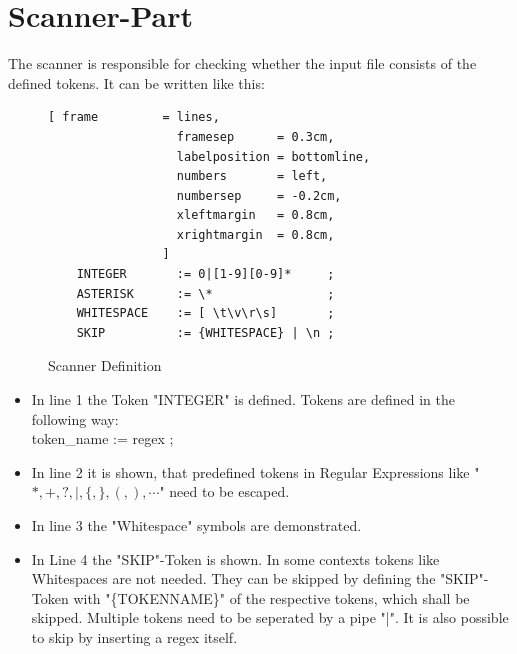 \section{Scanner-Part}
The scanner is responsible for checking whether the input file consists of the defined tokens. It can be written like this:
\begin{figure}[!ht]
\begin{Verbatim}[ frame         = lines, 
                  framesep      = 0.3cm, 
                  labelposition = bottomline,
                  numbers       = left,
                  numbersep     = -0.2cm,
                  xleftmargin   = 0.8cm,
                  xrightmargin  = 0.8cm,
                ]
	INTEGER       := 0|[1-9][0-9]*     ;
	ASTERISK      := \*                ;
	WHITESPACE    := [ \t\v\r\s]       ;
	SKIP          := {WHITESPACE} | \n ;
\end{Verbatim}
\caption{Scanner Definition}
\label{fig:scanner_def}
\end{figure}
\begin{itemize}
	\item In line 1 the Token "INTEGER" is defined. Tokens are defined in the following way:\\
					token\_name := regex ;
	\item In line 2 it is shown, that predefined tokens in Regular Expressions like "$*,+,?,|,\{,\},(,),\cdots$" need to be escaped.
	\item In line 3 the "Whitespace" symbols are demonstrated.
	\item In Line 4 the "SKIP"-Token is shown. In some contexts tokens like Whitespaces are not needed. They can be skipped by defining the "SKIP"-Token with "\{TOKENNAME\}" of the respective tokens, which shall be skipped. Multiple tokens need to be seperated by a pipe "|". It is also possible to skip by inserting a regex itself.
\end{itemize}

